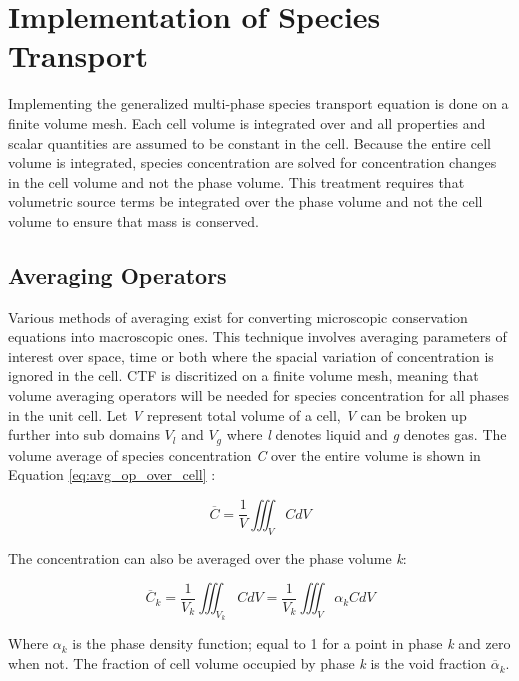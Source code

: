 \chapter{Implementation of Species Transport }\label{ch:implimentation_of_species_transport}

Implementing the generalized multi-phase species transport equation is done on a finite volume mesh. Each cell volume is integrated over and all properties and scalar quantities are assumed to be constant in the cell. Because the entire cell volume is integrated, species concentration are solved for concentration changes in the cell volume and not the phase volume. This treatment requires that volumetric source terms be integrated over the phase volume and not the cell volume to ensure that mass is conserved. 

\section{Averaging Operators}
Various methods of averaging exist for converting microscopic conservation equations into macroscopic ones. This technique involves averaging parameters of interest over space, time or both where the spacial variation of concentration is ignored in the cell. CTF is discritized on a finite volume mesh, meaning that volume averaging operators will be needed for species concentration for all phases in the unit cell. Let \textit{V} represent total volume of a cell, \textit{V} can be broken up further into sub domains \textit{$V_{l}$} and \textit{$V_{g}$} where \textit{l} denotes liquid and \textit{g} denotes gas. The volume average of species concentration \textit{C} over the entire volume is shown in Equation \ref{eq:avg_op_over_cell} \cite{kazimi1990}:

\begin{equation}
    \overline{C} = \frac{1}{V}\iiint_{V}CdV
    \label{eq:avg_op_over_cell}
\end{equation}

The concentration can also be averaged over the phase volume \textit{k}:

\begin{equation}
    \overline{C}_{k} = \frac{1}{V_{k}}\iiint_{V_{k}}CdV = \frac{1}{V_{k}}\iiint_{V}\alpha_{k}CdV
    \label{eq:avg_spec_con}
\end{equation}

Where $\alpha_{k}$ is the phase density function; equal to 1 for a point in phase \textit{k} and zero when not. The fraction of cell volume occupied by phase \textit{k} is the void fraction $\overline{\alpha}_{k}$.

